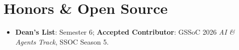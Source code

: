 \section*{Honors \& Open Source}
\BigDivider
\begin{itemize}[leftmargin=*, itemsep=0.1em, topsep=0.1em]
    \item \textbf{Dean's List}: Semester 6; \textbf{Accepted Contributor}: GSSoC 2026 \textit{AI \& Agents Track}, SSOC Season 5.
\end{itemize}


